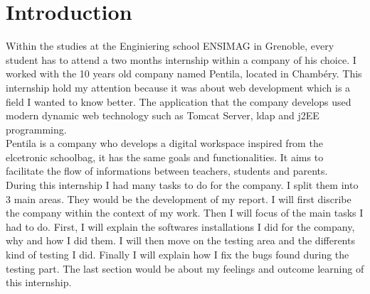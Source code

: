 
\section*{Introduction}

Within the studies at the Enginiering school ENSIMAG in Grenoble, every student has
to attend a two months internship within a company of his choice.
I worked with the 10 years old company named Pentila, located in Chambéry. 
This internship hold my attention because it was about web development which is a field 
I wanted to know better. The application that the company develops used modern
dynamic web technology such as Tomcat Server, ldap and j2EE programming. \\  


Pentila is a company who develops a digital workspace inspired from the elcetronic schoolbag, it has
the same goals and functionalities. It aims to facilitate the flow of informations between 
teachers, students and parents. \\

During this internship I had many tasks to do for the company. I split them into 3 main
areas. They would be the development of my report.  
I will first discribe the company within the context of my work.
Then I will focus of the main tasks I had to do. First, I will explain the softwares 
installations I did for the company, why and how I did them. I will then move on the testing
area and the differents kind of testing I did. Finally I will explain how I fix the bugs 
found during the testing part. The last section would be about my feelings and outcome
learning of this internship.  
